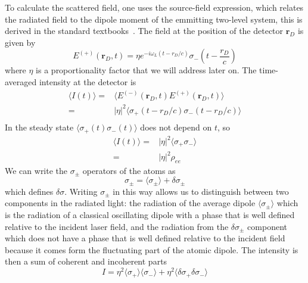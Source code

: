 \documentclass[11pt,letter]{article}
\newcommand{\bv}[1]{\ensuremath{\bm{#1}}}
\begin{document}
To calculate the scattered field, one uses the source-field expression, which
relates the radiated field to the dipole moment of the emmitting two-level
system, this is derived in the standard
textbooks~\cite{loudon2000quantum,cohen1998atom}.  The field at the position of
the detector $\bv{r}_{D}$ is given by
\begin{equation} 
    E^{(+)}( \bv{r}_{D}, t) = 
    \eta e^{- i \omega_{L} ( t -r_{D}/c) } 
    \sigma_{-}\left(t - \frac{ r_{D} }{c} \right)
    \label{eq:source-field} 
\end{equation} where $\eta$
is a proportionality factor that we will address later on.  The time-averaged
intensity at the detector is 
\begin{equation}
\label{eq:Idef}
\begin{split}
\langle I (t) \rangle = & 
    \langle E^{(-)}(\bv{r}_{D}, t) E^{(+)}(\bv{r}_{D}, t) \rangle \\
   = & |\eta|^{2} \langle \sigma_{+}(t-r_{D}/c)\sigma_{-}(t-r_{D}/c) \rangle  \\
\end{split}
\end{equation}
In the steady state $\langle \sigma_{+}(t) \sigma_{-}(t) \rangle$ does not depend on $t$,
so
\begin{equation}
\begin{split} 
\langle I (t) \rangle  
   = & |\eta|^{2} \langle \sigma_{+}\sigma_{-} \rangle \\
   = & |\eta|^{2} \rho_{ee}  
\end{split} 
\end{equation}
We can write the $\sigma_{\pm}$ operators of the atoms as 
\begin{equation} 
    \sigma_{\pm} = \langle \sigma_{\pm} \rangle + \delta \sigma_{\pm} 
\end{equation}
which defines $\delta \sigma$.   Writing $\sigma_{\pm}$ in this way allows us
to distinguish between two components in the radiated light:  the radiation of
the average dipole $\langle \sigma_{\pm}\rangle$ which is the radiation of a
classical oscillating dipole with a phase that is well defined relative to the
incident laser field, and the radiation from the $\delta \sigma_{\pm}$
component which does not have a phase that is well defined relative to the
incident field because it comes form the fluctuating part of the atomic dipole.
The intensity is then a sum of coherent and incoherent parts 
\begin{equation} 
I  = \eta^{2} \langle \sigma_{+}\rangle \langle \sigma_{-} \rangle 
   + \eta^{2} \langle \delta \sigma_{+} \delta \sigma_{-} \rangle 
\end{equation}
\end{document}
